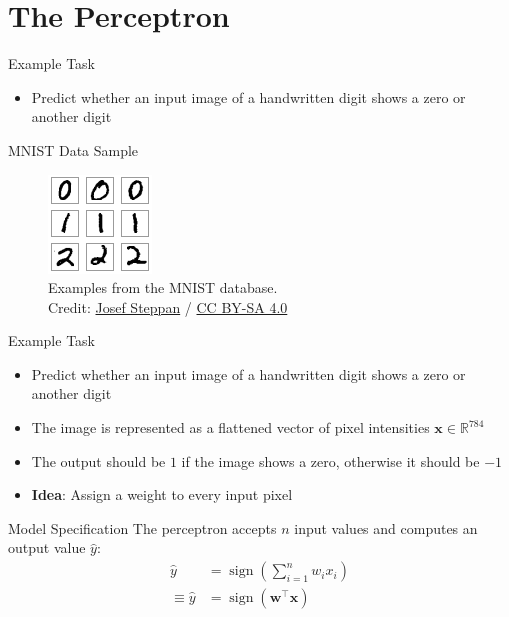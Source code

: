 \documentclass{beamer}
\DeclareMathOperator{\sign}{sign}
\begin{document}
	\section{The Perceptron}
	\begin{frame}{Example Task}
		\begin{itemize}
			\item<1-> Predict whether an input image of a handwritten digit shows a zero or another digit
		\end{itemize}
	\end{frame}
	\begin{frame}{MNIST Data Sample}
		\begin{figure}
			\includegraphics[scale=1.6]{img/mnist}
			\caption{Examples from the {MNIST} database. \\Credit: 
				\href{https://commons.wikimedia.org/wiki/File:MnistExamples.png}{Josef Steppan}
				/ \href{https://creativecommons.org/licenses/by-sa/4.0/deed.en}{CC BY-SA 4.0}}
		\end{figure}
	\end{frame}
	\begin{frame}{Example Task}
		\begin{itemize}
			\item <1-> Predict whether an input image of a handwritten digit shows a zero or another digit
			\item <1-> The image is represented as a flattened vector of pixel intensities $\bm{x} \in \mathbb{R}^{784}$
			\item <2-> The output should be $1$ if the image shows a zero, otherwise it should be $-1$
			\item <3-> \textbf{Idea}: Assign a weight to every input pixel
		\end{itemize}
	\end{frame}
	\begin{frame}{Model Specification}
		The perceptron accepts $n$ input values and computes an output value $\hat{y}$:
		\begin{equation}
			\begin{split}
			\hat{y} &= \sign\left (\sum_{i=1}^{n} w_ix_i\right )\\
			\equiv \hat{y} &= \sign\left (\bm{w}^\top\bm{x}\right )
			\end{split}
		\end{equation}
	\end{frame}
\end{document}

